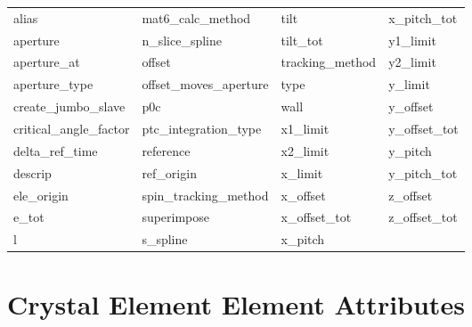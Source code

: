  \begin{tabular}{llll} \toprule
alias                       & mat6_calc_method            & tilt                        & x_pitch_tot                 \\
aperture                    & n_slice_spline              & tilt_tot                    & y1_limit                    \\
aperture_at                 & offset                      & tracking_method             & y2_limit                    \\
aperture_type               & offset_moves_aperture       & type                        & y_limit                     \\
create_jumbo_slave          & p0c                         & wall                        & y_offset                    \\
critical_angle_factor       & ptc_integration_type        & x1_limit                    & y_offset_tot                \\
delta_ref_time              & reference                   & x2_limit                    & y_pitch                     \\
descrip                     & ref_origin                  & x_limit                     & y_pitch_tot                 \\
ele_origin                  & spin_tracking_method        & x_offset                    & z_offset                    \\
e_tot                       & superimpose                 & x_offset_tot                & z_offset_tot                \\
l                           & s_spline                    & x_pitch                     &                             \\
 \bottomrule
 \end{tabular}
 \vfill
 
 \section{Crystal Element Element Attributes}
 \label{s:list.crystal}
 
